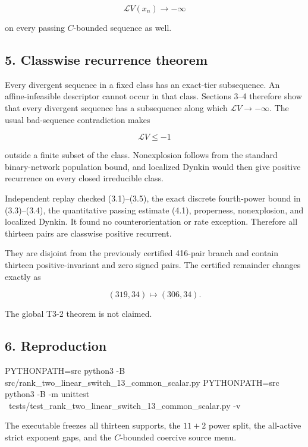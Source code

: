 \[
             \mathcal LV(x_n)\longrightarrow-\infty \tag{4.4}
\]

on every passing \(C\)-bounded sequence as well.

\subsection{5. Classwise recurrence
theorem}

Every divergent sequence in a fixed class has an exact-tier subsequence.
An affine-infeasible descriptor cannot occur in that class. Sections
3--4 therefore show that every divergent sequence has a subsequence
along which \(\mathcal LV\to-\infty\). The usual bad-sequence
contradiction makes

\[
             \mathcal LV\le-1                              \tag{5.1}
\]

outside a finite subset of the class. Nonexplosion follows from the
standard binary-network population bound, and localized Dynkin would
then give positive recurrence on every closed irreducible class.

Independent replay checked (3.1)--(3.5), the exact discrete fourth-power
bound in (3.3)--(3.4), the quantitative passing estimate (4.1),
properness, nonexplosion, and localized Dynkin. It found no
counterorientation or rate exception. Therefore all thirteen pairs are
classwise positive recurrent.

They are disjoint from the previously certified 416-pair branch and
contain thirteen positive-invariant and zero signed pairs. The certified
remainder changes exactly as

\[
 (319,34)\longmapsto(306,34).                       \tag{5.2}
\]

The global T3-2 theorem is not claimed.

\subsection{6. Reproduction}

\begin{CodeBlock}
PYTHONPATH=src python3 -B src/rank_two_linear_switch_13_common_scalar.py
PYTHONPATH=src python3 -B -m unittest \
  tests/test_rank_two_linear_switch_13_common_scalar.py -v
\end{CodeBlock}

The executable freezes all thirteen supports, the \(11+2\) power split,
the all-active strict exponent gaps, and the \(C\)-bounded coercive
source menu.
